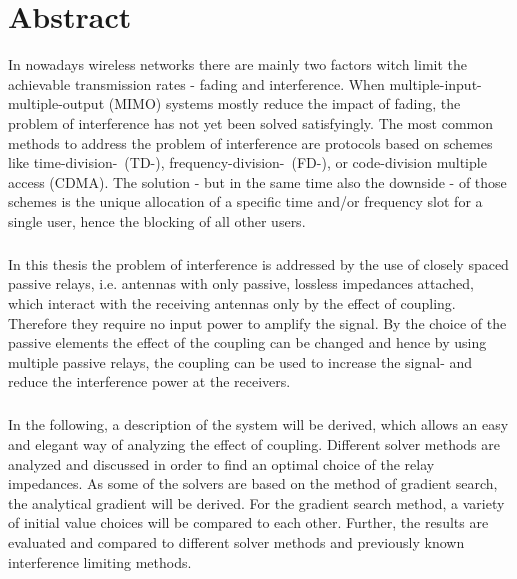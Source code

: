\chapter*{Abstract}

In nowadays wireless networks there are mainly two factors witch limit the achievable transmission rates - fading and interference.
When multiple-input-multiple-output (MIMO) systems mostly reduce the impact of fading, the problem of interference has not yet been solved satisfyingly.
The most common methods to address the problem of interference are protocols based on schemes like time-division-~(TD-), frequency-division-~(FD-), or code-division multiple access (CDMA).
The solution - but in the same time also the downside - of those schemes is the unique allocation of a specific time and/or frequency slot for a single user, hence the blocking of all other users.
\paragraph{}
In this thesis the problem of interference is addressed by the use of closely spaced passive relays, i.e. antennas with only passive, lossless impedances attached, which interact with the receiving antennas only by the effect of coupling.
Therefore they require no input power to amplify the signal.
By the choice of the passive elements the effect of the coupling can be changed and hence by using multiple passive relays, the coupling can be used to increase the signal- and reduce the interference power at the receivers.
\paragraph{}
In the following, a description of the system will be derived, which allows an easy and elegant way of analyzing the effect of coupling.
Different solver methods are analyzed and discussed in order to find an optimal choice of the relay impedances.
As some of the solvers are based on the method of gradient search, the analytical gradient will be derived.
For the gradient search method, a variety of initial value choices will be compared to each other.
Further, the results are evaluated and compared to different solver methods and previously known interference limiting methods.
